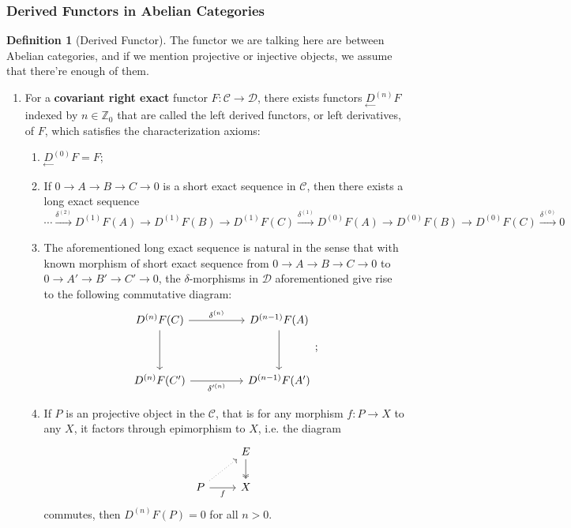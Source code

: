 \documentclass[10pt]{report}
\theoremstyle{definition}
\newtheorem{definition}{Definition}
\begin{document}
\subsubsection{Derived Functors in Abelian Categories}

\begin{definition}[Derived Functor]
The functor we are talking here are between Abelian categories, and if we mention projective or injective objects, we assume that there're enough of them.
\begin{enumerate}
\item For a \textbf{covariant right exact} functor $F:\mathcal{C}\to\mathcal{D}$, there exists functors $\underset{\leftarrow}{D}^{(n)}F$ indexed by $n\in\mathbb{Z}_0$ that are called the left derived functors, or left derivatives, of $F$, which satisfies the characterization axioms:
\begin{enumerate}
\item $\underset{\leftarrow}{D}^{(0)}F=F$;
\item If $0\to A\to B\to C\to 0$ is a short exact sequence in $\mathcal{C}$, then there exists a long exact sequence $$\cdots\overset{\delta^{(2)}}{\to}D^{(1)}F(A)\to D^{(1)}F(B)\to D^{(1)}F(C)\overset{\delta^{(1)}}{\to}D^{(0)}F(A)\to D^{(0)}F(B)\to D^{(0)}F(C)\overset{\delta^{(0)}}{\to}0$$

\item The aforementioned long exact sequence is natural in the sense that with known morphism of short exact sequence from $0\to A\to B\to C\to0$ to $0\to A'\to B'\to C'\to0$, the $\delta$-morphisms in $\mathcal{D}$ aforementioned give rise to the following commutative diagram:
        $$
        \begin{tikzcd}
D^{(n)}F(C) \arrow[rr, "\delta^{(n)}"] \arrow[dd] &  & D^{(n-1)}F(A) \arrow[dd] \\
                                                                         &  &                                                 \\
D^{(n)}F(C') \arrow[rr, "{\delta'^{(n)}}"']       &  & D^{(n-1)}F(A')
\end{tikzcd};
        $$
\item If $P$ is an projective object in the $\mathcal{C}$, that is for any morphism $f:P\to X$ to any $X$, it factors through epimorphism to $X$, i.e. the diagram
    $$
    \begin{tikzcd}
                                     & E \arrow[d, two heads] \\
P \arrow[r, "f"'] \arrow[ru, dotted] & X
\end{tikzcd}
    $$
    commutes, then $D^{(n)}F(P)=0$ for all $n>0$.
\end{enumerate}


\end{enumerate}
\end{definition}
\end{document}
